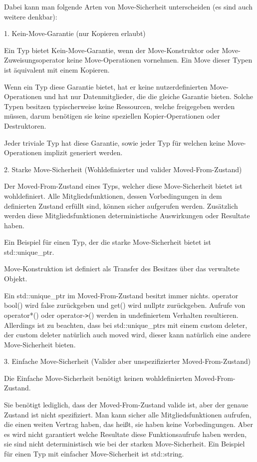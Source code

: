 \documentclass{article}
\begin{document}
Dabei kann man folgende Arten von Move-Sicherheit unterscheiden (es sind auch weitere 
denkbar):

1. Kein-Move-Garantie (nur Kopieren erlaubt)

Ein Typ bietet Kein-Move-Garantie, wenn der Move-Konstruktor oder Move-Zuweisungsoperator 
keine Move-Operationen vornehmen. Ein Move dieser Typen ist äquivalent mit einem 
Kopieren.

Wenn ein Typ diese Garantie bietet, hat er keine nutzerdefinierten Move-Operationen 
und hat nur Datenmitglieder, die die gleiche Garantie bieten. Solche Typen besitzen 
typischerweise keine Ressourcen, welche freigegeben werden müssen, darum benötigen 
sie keine speziellen Kopier-Operationen oder Destruktoren.

Jeder triviale Typ hat diese Garantie, sowie jeder Typ für welchen keine Move-Operationen 
implizit generiert werden.

\vspace{12pt}
2. Starke Move-Sicherheit (Wohldefinierter und valider Moved-From-Zustand)

Der Moved-From-Zustand eines Typs, welcher diese Move-Sicherheit bietet ist wohldefiniert. 
Alle Mitgliedsfunktionen, dessen Vorbedingungen in dem definierten Zustand erfüllt 
sind, können sicher aufgerufen werden. Zusätzlich werden diese Mitgliedsfunktionen 
deterministische Auswirkungen oder Resultate haben.

Ein Beispiel für einen Typ, der die starke Move-Sicherheit bietet ist std::unique\_ptr.

Move-Konstruktion ist definiert als Transfer des Besitzes über das verwaltete 
Objekt.

Ein std::unique\_ptr im Moved-From-Zustand besitzt immer nichts. operator bool() 
wird false zurückgeben und get() wird nullptr zurückgeben. Aufrufe von operator*() 
oder operator-\texttt{>}() werden in undefiniertem Verhalten resultieren. Allerdings 
ist zu beachten, dass bei std::unique\_ptrs mit einem custom deleter, der custom 
deleter natürlich auch moved wird, dieser kann natürlich eine andere Move-Sicherheit 
bieten.

\vspace{12pt}
3. Einfache Move-Sicherheit (Valider aber unspezifizierter Moved-From-Zustand)

Die Einfache Move-Sicherheit benötigt keinen wohldefinierten Moved-From-Zustand.

Sie benötigt lediglich, dass der Moved-From-Zustand valide ist, aber der genaue 
Zustand ist nicht spezifiziert. Man kann sicher alle Mitgliedsfunktionen aufrufen, 
die einen weiten Vertrag haben, das heißt, sie haben keine Vorbedingungen. Aber 
es wird nicht garantiert welche Resultate diese Funktionsaufrufe haben werden, 
sie sind nicht deterministisch wie bei der starken Move-Sicherheit. Ein Beispiel 
für einen Typ mit einfacher Move-Sicherheit ist std::string.
\end{document}
